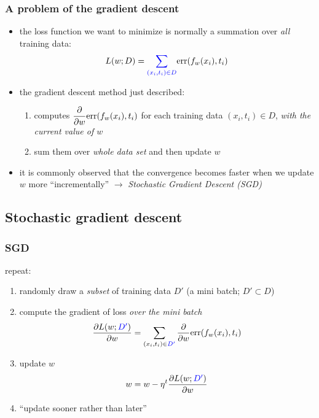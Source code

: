 \documentclass[12pt,dvipdfmx]{beamer}
\newcommand{\ao}[1]{{\color{blue}#1}}
\begin{document}
\begin{frame}
\frametitle{A problem of the gradient descent}
\begin{itemize}
\item<1-> the loss function we want to minimize is normally a summation over
  \ao{\emph{all}} training data:
\[ L(w; D) = \ao{\sum_{(x_i,t_i)\in D}} \mbox{err}(f_w(x_i), t_i) \]

\item<2-> the gradient descent method just described:
  \begin{enumerate}
  \item computes ${\displaystyle\frac{\partial }{\partial w}\mbox{err}(f_w(x_i), t_i)}$ for each training data $(x_i,t_i) \in D$,
    \ao{\emph{with the current value of $w$}}
  \item sum them over \ao{\emph{whole data set}} and then update $w$
  \end{enumerate}
  
\item<3-> it is commonly observed that the
  convergence becomes faster when we update
  $w$ more ``incrementally'' $\rightarrow$ 
  \ao{\emph{Stochastic Gradient Descent (SGD)}}
\end{itemize}
\end{frame}

\subsection{Stochastic gradient descent}

\begin{frame}
\frametitle{SGD}

repeat:
\begin{enumerate}
\item<1-> randomly draw a \ao{\emph{subset}} of training data $D'$ (a mini batch; $D' \subset D$)
\item<2-> compute the gradient of loss \ao{\emph{over the mini batch}}
\[ \pp{L(w; \ao{D'})}{w} = \sum_{(x_i,t_i)\in \ao{D'}} \pp{}{w} \mbox{err}(f_w(x_i), t_i) \]
\item<3-> update $w$
\[ w = w - \eta {}^t \pp{L(w; \ao{D'})}{w} \]

\item<3-> ``update sooner rather than later''
\end{enumerate}
\end{frame}
\end{document}
